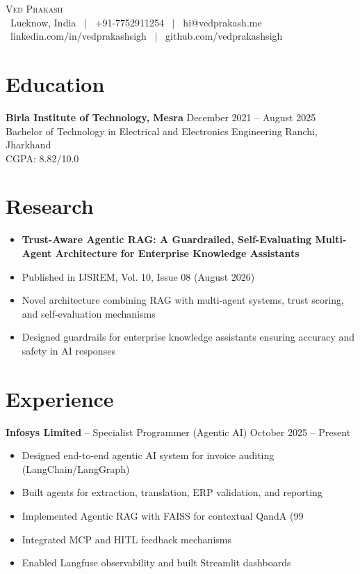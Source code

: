 \documentclass[letterpaper,10pt]{article}
\begin{document}
\begin{center}
    {\Huge\scshape Ved Prakash} \\
    \faMapMarker\ Lucknow, India \ $|$
    \faPhone\ +91-7752911254 \ $|$
    \faEnvelope\ hi@vedprakash.me \\
    \faLinkedin\ linkedin.com/in/vedprakashsigh \ $|$
    \faGithub\ github.com/vedprakashsigh
\end{center}

\section{Education}
\textbf{Birla Institute of Technology, Mesra} \hfill December 2021 -- August 2025 \\
Bachelor of Technology in Electrical and Electronics Engineering \hfill Ranchi, Jharkhand \\
CGPA: 8.82/10.0

\section{Research}
\begin{itemize}
  \item \textbf{Trust-Aware Agentic RAG: A Guardrailed, Self-Evaluating Multi-Agent Architecture for Enterprise Knowledge Assistants}
  \item Published in IJSREM, Vol. 10, Issue 08 (August 2026)
  \item Novel architecture combining RAG with multi-agent systems, trust scoring, and self-evaluation mechanisms
  \item Designed guardrails for enterprise knowledge assistants ensuring accuracy and safety in AI responses
\end{itemize}

\section{Experience}
\textbf{Infosys Limited} -- Specialist Programmer (Agentic AI) \hfill October 2025 -- Present
\begin{itemize}
  \item Designed end-to-end agentic AI system for invoice auditing (LangChain/LangGraph)
  \item Built agents for extraction, translation, ERP validation, and reporting
  \item Implemented Agentic RAG with FAISS for contextual QandA (99%
  \item Integrated MCP and HITL feedback mechanisms
  \item Enabled Langfuse observability and built Streamlit dashboards
\end{itemize}
\end{document}
